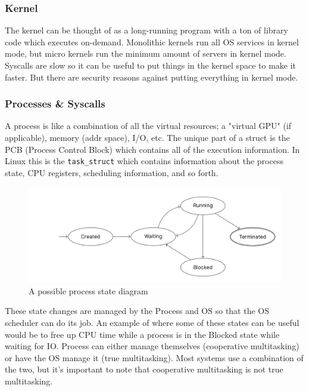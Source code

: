 \documentclass[../notes.tex]{subfiles}
\begin{document}
\subsubsection{Kernel}
The kernel can be thought of as a long-running program with a ton of library code which executes on-demand. Monolithic kernels run all OS services in kernel mode, but micro kernels run the minimum amount of servers in kernel mode. Syscalls are slow so it can be useful to put things in the kernel space to make it faster. But there are security reasons against putting everything in kernel mode.


\subsubsection{Processes \& Syscalls}

A process is like a combination of all the virtual resources; a "virtual GPU" (if applicable), memory (addr space), I/O, etc.
The unique part of a struct is the PCB (Process Control Block) which contains all of the execution information. In Linux this is the \texttt{task\_struct} which contains information about the process state, CPU registers, scheduling information, and so forth.


\begin{figure}[H]
  \centering
  \includegraphics[width=0.8\linewidth]{img/image_2023-01-12-15-21-01.png}
  \caption{A possible process state diagram}
\end{figure}

These state changes are managed by the Process and OS so that the OS scheduler can do its job.
An example of where some of these states can be useful would be to free up CPU time while a process is in the Blocked state while waiting for IO.
Process can either manage themselves (cooperative multitasking) or have the OS manage it (true multitasking).
Most systems use a combination of the two, but it's important to note that cooperative multitasking is not true multitasking.

\end{document}
